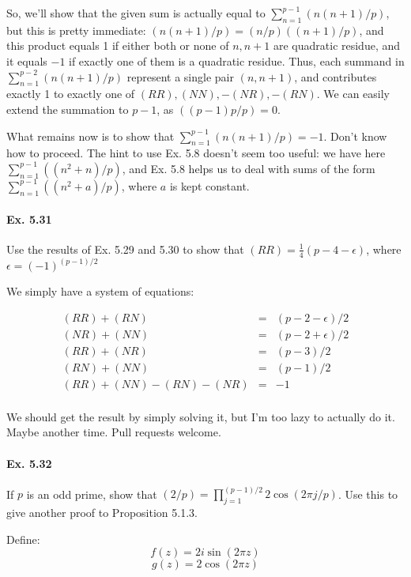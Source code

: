 \documentclass[notitlepage]{article}
\theoremstyle{definition}
\begin{document}
So, we'll show that the given sum is actually equal to
$\sum_{n=1}^{p-1}(n(n+1)/p)$, but this is pretty immediate:
$(n(n+1)/p) = (n/p)((n+1)/p)$, and this product equals 1 if either
both or none of $n, n+1$ are quadratic residue, and it equals $-1$ if
exactly one of them is a quadratic residue. Thus, each summand in
$\sum_{n=1}^{p-2}(n(n+1)/p)$ represent a single pair $(n, n+1)$, and
contributes exactly 1 to exactly one of $(RR), (NN), -(NR), -(RN)$. We
can easily extend the summation to $p-1$, as $((p-1)p/p) = 0$.

What remains now is to show that $\sum_{n=1}^{p-1}(n(n+1)/p) =
-1$. Don't know how to proceed. The hint to use Ex. 5.8 doesn't seem
too useful: we have here $\sum_{n=1}^{p-1}((n^2 + n)/p)$, and Ex. 5.8
helps us to deal with sums of the form $\sum_{n=1}^{p-1}((n^2 +
a)/p)$, where $a$ is kept constant.

\paragraph{Ex. 5.31}
Use the results of Ex. 5.29 and 5.30 to show that $(RR) =
\frac{1}{4}(p-4-\epsilon)$, where $\epsilon = (-1)^{(p-1)/2}$

We simply have a system of equations:

\begin{eqnarray}
  (RR) + (RN) &=& (p-2-\epsilon)/2 \\
  (NR) + (NN) &=& (p-2+\epsilon)/2 \\
  (RR) + (NR) &=& (p-3)/2 \\
  (RN) + (NN) &=& (p-1)/2 \\
  (RR) + (NN) - (RN) - (NR) &=& -1  \\
\end{eqnarray}

We should get the result by simply solving it, but I'm too lazy to
actually do it. Maybe another time. Pull requests welcome.

\paragraph{Ex. 5.32}
If $p$ is an odd prime, show that $(2/p) = \prod_{j=1}^{(p-1)/2} 2
\cos(2 \pi j/p)$. Use this to give another proof to Proposition 5.1.3.

Define:
\begin{equation}
  f(z) = 2 i \sin(2 \pi z)
\end{equation}
\begin{equation}
  g(z) = 2 \cos(2 \pi z)
\end{equation}
\end{document}
